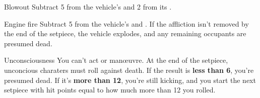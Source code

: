 
\begin{describe}{Blowout}
  Subtract 5 from the vehicle's  and 2 from its .
\end{describe}

\begin{describe}{Engine fire}
  Subtract 5 from the vehicle's  and . If the affliction isn't removed by the end of the setpiece, the vehicle explodes, and any remaining occupants are presumed dead.
\end{describe}

\begin{describe}{Unconsciousness}
  You can't act or man\oe{}uvre. At the end of the setpiece, unconcious charaters must roll  against death. If the result is \textbf{less than 6}, you're presumed dead. If it's \textbf{more than 12}, you're still kicking, and you start the next setpiece with hit points equal to how much more than 12 you rolled.
\end{describe}
